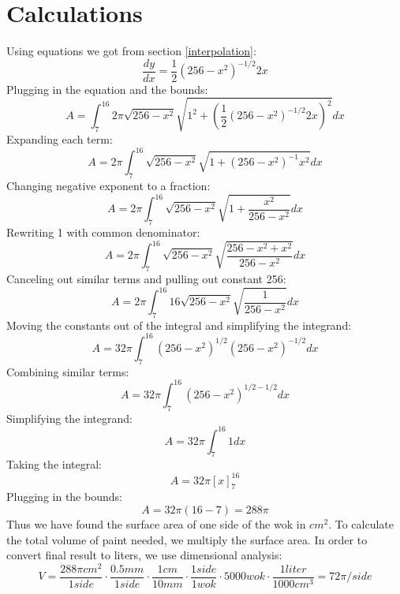 \documentclass[a4paper, 12pt]{article}
\begin{document}
	\section{Calculations} 
		Using equations we got from section \ref{interpolation}: $$\frac{dy}{dx}=\frac{1}{2}{(256-x^2)}^{-1/2} 2x$$
		Plugging in the equation and the bounds:$$A = \int_7^{16} 2\pi \sqrt{256-x^2}\sqrt{1^2+{(\frac{1}{2}{(256-x^2)}^{-1/2} 2x)}^2}dx$$
		Expanding each term:$$A =2\pi \int_7^{16} \sqrt{256-x^2}\sqrt{1+{(256-x^2)}^{-1} x^2}dx$$
		Changing negative exponent to a fraction:$$A =2\pi \int_7^{16} \sqrt{256-x^2}\sqrt{1+\frac{x^2}{256-x^2}}dx$$
		Rewriting 1 with common denominator:$$A =2\pi \int_7^{16} \sqrt{256-x^2}\sqrt{\frac{256-x^2+x^2}{256-x^2}}dx$$
		Canceling out similar terms and pulling out constant 256:$$A =2\pi \int_7^{16} 16\sqrt{256-x^2} \sqrt{\frac{1}{256-x^2}}dx$$
		Moving the constants out of the integral and simplifying the integrand:$$A =32\pi \int_7^{16}{(256-x^2)}^{1/2} {(256-x^2)}^{-1/2}dx$$
		Combining similar terms:$$A =32\pi \int_7^{16}{(256-x^2)}^{1/2-1/2} dx$$
		Simplifying the integrand:$$A =32\pi \int_7^{16}1 dx$$
		Taking the integral:$$A =32\pi \left[x\right]_7^{16}$$
		Plugging in the bounds:$$A =32\pi {(16-7)}=288\pi$$
		Thus we have found the surface area of one side of the wok in $cm^2$. To calculate the total volume of paint needed, we multiply the surface area. In order to convert final result to liters, we use dimensional analysis:$$V=\frac{288\pi cm^2}{1 side}\cdot\frac{ 0.5 mm}{1 side} \cdot\frac{1 cm}{10 mm}\cdot\frac{1 side}{1 wok}\cdot5000 wok\cdot\frac{1 liter}{1000cm^3}=72\pi/side$$
\end{document}
